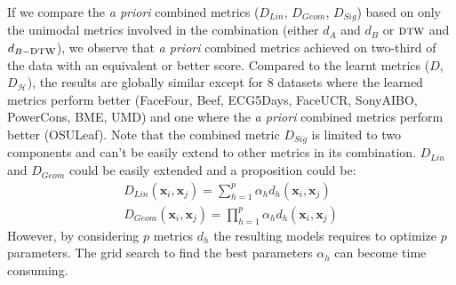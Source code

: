 \noindent If we compare the \textit{a priori} combined metrics ($D_{Lin}$, $D_{Geom}$, $D_{Sig}$) based on only the unimodal metrics involved in the combination (either $d_A$ and $d_B$ or $\mbox{\sc dtw}$ and $d_{B-\mbox{\sc dtw}}$), we observe that \textit{a priori} combined metrics achieved on two-third of the data with an equivalent or better score. Compared to the learnt metrics ($D$, $D_{\mathcal{H}}$), the results are globally similar except for 8 datasets where the learned metrics perform better (FaceFour, Beef, ECG5Days, FaceUCR, SonyAIBO, PowerCons, BME, UMD) and one where the \textit{a priori} combined metrics perform better (OSULeaf). Note that the combined metric $D_{Sig}$ is limited to two components and can't be easily extend to other metrics in its combination. $D_{Lin}$ and $D_{Geom}$ could be easily extended and a proposition could be:
\begin{align}
	D_{Lin}(\textbf{x}_i,\textbf{x}_j) = \sum\limits_{h=1}^{p} \alpha_h d_h(\textbf{x}_i,\textbf{x}_j) \\
	D_{Geom}(\textbf{x}_i,\textbf{x}_j) = \prod\limits_{h=1}^{p} \alpha_h d_h(\textbf{x}_i,\textbf{x}_j)
\end{align}
However, by considering $p$ metrics $d_h$ the resulting models requires to optimize $p$ parameters. The grid search to find the best parameters $\alpha_h$ can become time consuming. \\

